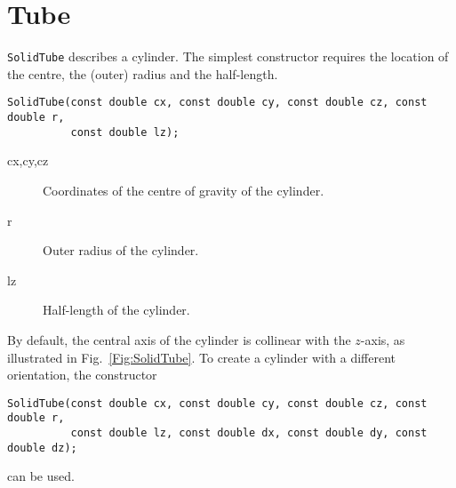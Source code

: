 \section{Tube}
\texttt{SolidTube} describes a cylinder. The simplest constructor requires
the location of the centre, the (outer) radius and the half-length. 
\begin{lstlisting}
SolidTube(const double cx, const double cy, const double cz, const double r,
          const double lz);
\end{lstlisting}
\begin{description}
\item[cx,cy,cz] Coordinates of the centre of gravity of the cylinder.
\item[r] Outer radius of the cylinder.
\item[lz] Half-length of the cylinder.
\end{description}
By default, the central axis of the cylinder is collinear with the $z$-axis,
 as illustrated in Fig.~\ref{Fig:SolidTube}. 
To create a cylinder with a different orientation, the constructor
\begin{lstlisting}
SolidTube(const double cx, const double cy, const double cz, const double r,
          const double lz, const double dx, const double dy, const double dz);
\end{lstlisting} 
can be used.

